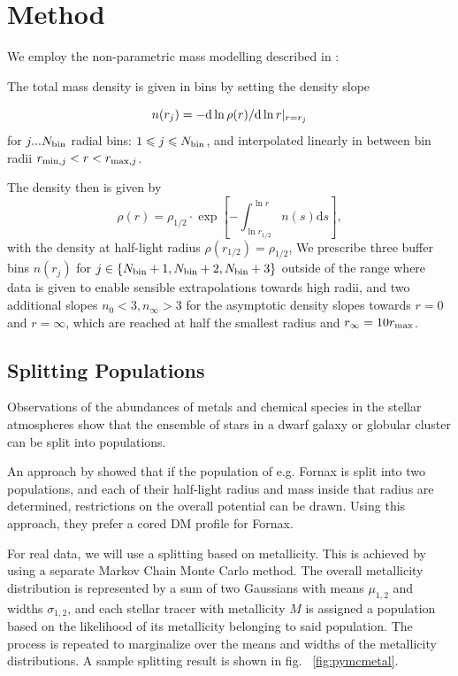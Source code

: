 \section{Method}\label{sec:method}
We employ the non-parametric mass modelling described in
\citep{Steger+2014}:

The total mass density is given in bins by setting the density slope

\begin{equation}
n(r_j)=-{\rm d}\ln\rho(r)/{\rm d}\ln r|_{r=r_j}
\end{equation}
for $j ... N_{\rm bin}$ radial bins: $1\leq j\leq N_{\rm bin}$, and
interpolated linearly in between bin radii $r_{{\rm min},j}<r<r_{{\rm
    max},j}$.

The density then is given by
\begin{equation*}
    \rho(r) = \rho_{1/2}\cdot\exp\left[-\int_{\ln r_{1/2}}^{\ln r}n(s)\text{d}s\right],
\end{equation*}
with the density at half-light radius $\rho(r_{1/2})=\rho_{1/2}$, We
prescribe three buffer bins $n(r_j)$ for $j\in\{N_{\rm bin}+1,
N_{\rm bin}+2, N_{\rm bin}+3\}$ outside of the range where data is given to
enable sensible extrapolations towards high radii, and two additional slopes
$n_0 < 3, n_\infty>3$ for the asymptotic density slopes towards $r=0$ and
$r=\infty$, which are reached at half the smallest radius and $r_\infty=10r_{\rm
  max}$.


\subsection{Splitting Populations}\label{sec:metals}
Observations of the abundances of metals and chemical species in the
stellar atmospheres show that the ensemble of stars in a dwarf galaxy
or globular cluster can be split into populations.

An approach by \cite{WalkerPenarrubia2011} showed that if the
population of e.g. Fornax is split into two populations, and each of
their half-light radius and mass inside that radius are determined, restrictions on the
overall potential can be drawn. Using this approach, they prefer a
cored DM profile for Fornax.

For real data, we will use a splitting based on metallicity. This is
achieved by using a separate Markov Chain Monte Carlo method. The
overall metallicity distribution is represented by a sum of two
Gaussians with means $\mu_{1,2}$ and widths $\sigma_{1,2}$, and each
stellar tracer with metallicity $M$ is assigned a population based on
the likelihood of its metallicity belonging to said population. The
process is repeated to marginalize over the means and widths of the
metallicity distributions. A sample splitting result is shown in
fig. ~\ref{fig:pymcmetal}.

